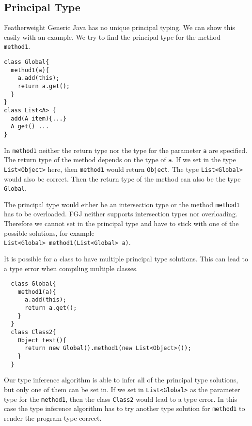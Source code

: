 \subsection{Principal Type}
Featherweight Generic Java has no unique principal typing.
We can show this easily with an example.
We try to find the principal type for the method \texttt{method1}.
\begin{lstlisting}
class Global{
  method1(a){
    a.add(this);
    return a.get();
  }
}
class List<A> {
  add(A item){...}
  A get() ...
}
\end{lstlisting}
In \texttt{method1} neither the return type nor the type for the parameter \texttt{a} are specified.
The return type of the method depends on the type of \texttt{a}.
If we set in the type \texttt{List<Object>} here, then \texttt{method1} would return \texttt{Object}.
The type \texttt{List<Global>} would also be correct.
Then the return type of the method can also be the type \texttt{Global}.

The principal type would either be an intersection type or the method \texttt{method1} has to be overloaded.
FGJ neither supports intersection types nor overloading.
Therefore we cannot set in the principal type and have to stick with one of the possible solutions,
for example\\
\texttt{List<Global> method1(List<Global> a)}.

It is possible for a class to have multiple principal type solutions.
This can lead to a type error when compiling multiple classes.
\begin{lstlisting}
  class Global{
    method1(a){
      a.add(this);
      return a.get();
    }
  }
  class Class2{
    Object test(){
      return new Global().method1(new List<Object>());
    }
  }
\end{lstlisting}
Our type inference algorithm is able to infer all of the principal type solutions, but only one of them can be set in.
If we set in \texttt{List<Global>} as the parameter type for the \texttt{method1},
then the class \texttt{Class2} would lead to a type error.
In this case the type inference algorithm has to try another type solution for \texttt{method1}
to render the program type correct.

